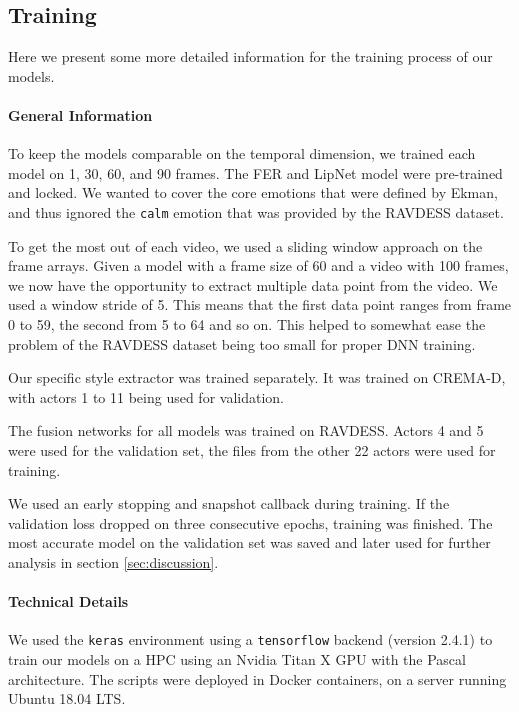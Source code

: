 \subsection{Training}
Here we present some more detailed information for the training process of our models.
\paragraph{General Information}
To keep the models comparable on the temporal dimension, we trained each model on 1, 30, 60, and 90 frames. The FER and LipNet model were pre-trained and locked. We wanted to cover the core emotions that were defined by Ekman, and thus ignored the \texttt{calm} emotion that was provided by the RAVDESS dataset.

To get the most out of each video, we used a sliding window approach on the frame arrays. Given a model with a frame size of 60 and a video with 100 frames, we now have the opportunity to extract multiple data point from the video. We used a window stride of 5. This means that the first data point ranges from frame 0 to 59, the second from 5 to 64 and so on. This helped to somewhat ease the problem of the RAVDESS dataset being too small for proper DNN training. 

Our specific style extractor was trained separately. It was trained on CREMA-D, with actors 1 to 11 being used for validation.

The fusion networks for all models was trained on RAVDESS. Actors 4 and 5 were used for the validation set, the files from the other 22 actors were used for training.

We used an early stopping and snapshot callback during training. If the validation loss dropped on three consecutive epochs, training was finished. The most accurate model on the validation set was saved and later used for further analysis in section \ref{sec:discussion}.

\paragraph{Technical Details}
We used the \texttt{keras} environment using a \texttt{tensorflow} backend (version 2.4.1) to train our models on a HPC using an Nvidia Titan X GPU with the Pascal architecture. The scripts were deployed in Docker containers, on a server running Ubuntu 18.04 LTS.

